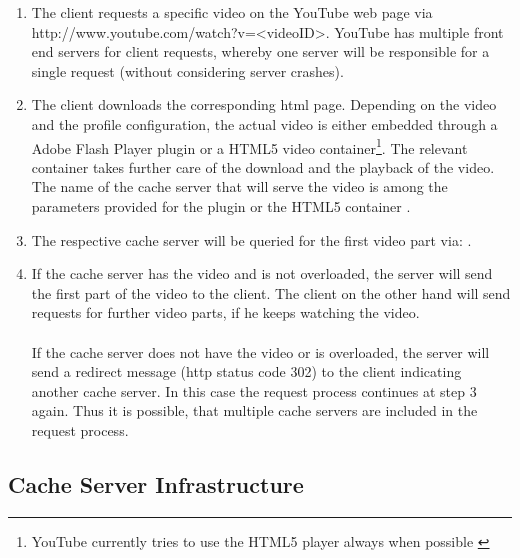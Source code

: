 \begin{enumerate}
  \item The client requests a specific video on the YouTube web page via http://www.youtube.com/watch?v=<videoID>. YouTube has multiple front end servers for client requests, whereby one server will be responsible for a single request (without considering server crashes).
  
  \item The client downloads the corresponding \gls{html} page. Depending on the video and the profile configuration, the actual video is either embedded through a Adobe Flash Player plugin or a HTML5 video container\footnote{YouTube currently tries to use the HTML5 player always when possible \cite{misc:youtube_html5}}. The relevant container takes further care of the download and the playback of the video. The name of the cache server that will serve the video is among the parameters provided for the plugin or the HTML5 container \cite{inpr:server_selection}.
  
  \item The respective cache server will be queried for the first video part via: . 

  \item If the cache server has the video and is not overloaded, the server will send the first part of the video to the client. The client on the other hand will send requests for further video parts, if he keeps watching the video. \\
\\
If the cache server does not have the video or is overloaded, the server will send a redirect message (\gls{http} status code 302) to the client indicating another cache server. In this case the request process continues at step 3 again. Thus it is possible, that multiple cache servers are included in the request process.
\end{enumerate}

\subsection{Cache Server Infrastructure}

